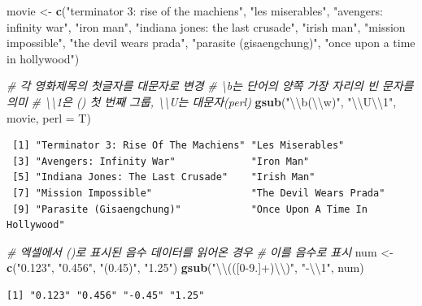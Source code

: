 \documentclass[
  11pt,
]{krantz}
\newenvironment{Shaded}{\begin{snugshade}}{\end{snugshade}}
\newcommand{\CharTok}[1]{\textcolor[rgb]{0.5,0.5,0.5}{#1}}
\newcommand{\CommentTok}[1]{\textcolor[rgb]{0.37,0.37,0.37}{\textit{#1}}}
\newcommand{\DataTypeTok}[1]{\textcolor[rgb]{0.27,0.27,0.27}{#1}}
\newcommand{\KeywordTok}[1]{\textcolor[rgb]{0.27,0.27,0.27}{\textbf{#1}}}
\newcommand{\NormalTok}[1]{#1}
\newcommand{\StringTok}[1]{\textcolor[rgb]{0.5,0.5,0.5}{#1}}
\begin{document}
\begin{Shaded}
\begin{Highlighting}[]
\NormalTok{movie <-}\StringTok{ }\KeywordTok{c}\NormalTok{(}\StringTok{"terminator 3: rise of the machiens"}\NormalTok{, }
           \StringTok{"les miserables"}\NormalTok{, }
           \StringTok{"avengers: infinity war"}\NormalTok{, }
           \StringTok{"iron man"}\NormalTok{, }
           \StringTok{"indiana jones: the last crusade"}\NormalTok{, }
           \StringTok{"irish man"}\NormalTok{, }
           \StringTok{"mission impossible"}\NormalTok{, }
           \StringTok{"the devil wears prada"}\NormalTok{, }
           \StringTok{"parasite (gisaengchung)"}\NormalTok{, }
           \StringTok{"once upon a time in hollywood"}\NormalTok{)}

\CommentTok{# 각 영화제목의 첫글자를 대문자로 변경}
\CommentTok{# \textbackslash{}b는 단어의 양쪽 가장 자리의 빈 문자를 의미}
\CommentTok{# \textbackslash{}\textbackslash{}1은 () 첫 번째 그룹, \textbackslash{}\textbackslash{}U는 대문자(perl)}
\KeywordTok{gsub}\NormalTok{(}\StringTok{"}\CharTok{\textbackslash{}\textbackslash{}}\StringTok{b(}\CharTok{\textbackslash{}\textbackslash{}}\StringTok{w)"}\NormalTok{, }\StringTok{"}\CharTok{\textbackslash{}\textbackslash{}}\StringTok{U}\CharTok{\textbackslash{}\textbackslash{}}\StringTok{1"}\NormalTok{, movie, }\DataTypeTok{perl =}\NormalTok{ T)}
\end{Highlighting}
\end{Shaded}

\begin{verbatim}
 [1] "Terminator 3: Rise Of The Machiens" "Les Miserables"                    
 [3] "Avengers: Infinity War"             "Iron Man"                          
 [5] "Indiana Jones: The Last Crusade"    "Irish Man"                         
 [7] "Mission Impossible"                 "The Devil Wears Prada"             
 [9] "Parasite (Gisaengchung)"            "Once Upon A Time In Hollywood"     
\end{verbatim}

\begin{Shaded}
\begin{Highlighting}[]
\CommentTok{# 엑셀에서 ()로 표시된 음수 데이터를 읽어온 경우}
\CommentTok{# 이를 음수로 표시}
\NormalTok{num <-}\StringTok{ }\KeywordTok{c}\NormalTok{(}\StringTok{"0.123"}\NormalTok{, }\StringTok{"0.456"}\NormalTok{, }\StringTok{"(0.45)"}\NormalTok{, }\StringTok{"1.25"}\NormalTok{)}
\KeywordTok{gsub}\NormalTok{(}\StringTok{"}\CharTok{\textbackslash{}\textbackslash{}}\StringTok{(([0-9.]+)}\CharTok{\textbackslash{}\textbackslash{}}\StringTok{)"}\NormalTok{, }\StringTok{"-}\CharTok{\textbackslash{}\textbackslash{}}\StringTok{1"}\NormalTok{, num)}
\end{Highlighting}
\end{Shaded}

\begin{verbatim}
[1] "0.123" "0.456" "-0.45" "1.25" 
\end{verbatim}

\normalsize

  

\printindex
\end{document}
